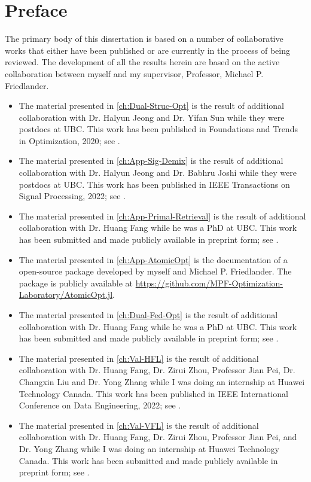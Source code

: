 
\chapter{Preface}

The primary body of this dissertation is based on a number of collaborative works that either have been published or are currently in the process of being reviewed. The development of all the results herein are based on the active collaboration between myself and my supervisor, Professor, Michael P. Friedlander.

\begin{itemize}
    \item The material presented in \autoref{ch:Dual-Struc-Opt} is the result of additional collaboration with Dr. Halyun Jeong and Dr. Yifan Sun while they were postdocs at UBC. This work has been published in Foundations and Trends in Optimization, 2020; see \citet{fan2019alignment}. 
    \item The material presented in \autoref{ch:App-Sig-Demix} is the result of additional collaboration with Dr. Halyun Jeong and Dr. Babhru Joshi while they were postdocs at UBC. This work has been published in IEEE Transactions on Signal Processing, 2022; see \citet{fan2020polar}. 
    \item The material presented in \autoref{ch:App-Primal-Retrieval} is the result of additional collaboration with Dr. Huang Fang while he was a PhD at UBC. This work has been submitted and made publicly available in preprint form; see \citet{fan2021safe}.
    \item The material presented in \autoref{ch:App-AtomicOpt} is the documentation of a open-source package developed by myself and Michael P. Friedlander. The package is publicly available at \url{https://github.com/MPF-Optimization-Laboratory/AtomicOpt.jl}. 
    \item The material presented in \autoref{ch:Dual-Fed-Opt} is the result of additional collaboration with Dr. Huang Fang while he was a PhD at UBC. This work has been submitted and made publicly available in preprint form; see \citet{fan2022dual}.
    \item The material presented in \autoref{ch:Val-HFL} is the result of additional collaboration with Dr. Huang Fang, Dr. Zirui Zhou, Professor Jian Pei, Dr. Changxin Liu and Dr. Yong Zhang while I was doing an internship at Huawei Technology Canada. This work has been published in IEEE International Conference on Data Engineering, 2022; see \citet{fan2022improving}. 
    \item The material presented in \autoref{ch:Val-VFL} is the result of additional collaboration with Dr. Huang Fang, Dr. Zirui Zhou, Professor Jian Pei, and Dr. Yong Zhang while I was doing an internship at Huawei Technology Canada. This work has been submitted and made publicly available in preprint form; see \citet{fan2022fair}. 
\end{itemize}




 







